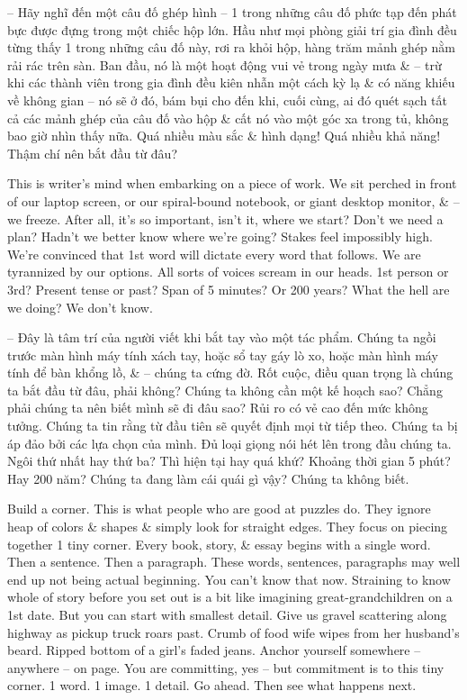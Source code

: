 \documentclass{article}
\begin{document}
\begin{itemize}
	-- Hãy nghĩ đến một câu đố ghép hình -- 1 trong những câu đố phức tạp đến phát bực được đựng trong một chiếc hộp lớn. Hầu như mọi phòng giải trí gia đình đều từng thấy 1 trong những câu đố này, rơi ra khỏi hộp, hàng trăm mảnh ghép nằm rải rác trên sàn. Ban đầu, nó là một hoạt động vui vẻ trong ngày mưa \& -- trừ khi các thành viên trong gia đình đều kiên nhẫn một cách kỳ lạ \& có năng khiếu về không gian -- nó sẽ ở đó, bám bụi cho đến khi, cuối cùng, ai đó quét sạch tất cả các mảnh ghép của câu đố vào hộp \& cất nó vào một góc xa trong tủ, không bao giờ nhìn thấy nữa. Quá nhiều màu sắc \& hình dạng! Quá nhiều khả năng! Thậm chí nên bắt đầu từ đâu?
	
	This is writer's mind when embarking on a piece of work. We sit perched in front of our laptop screen, or our spiral-bound notebook, or giant desktop monitor, \& -- we freeze. After all, it's so important, isn't it, where we start? Don't we need a plan? Hadn't we better know where we're going? Stakes feel impossibly high. We're convinced that 1st word will dictate every word that follows. We are tyrannized by our options. All sorts of voices scream in our heads. 1st person or 3rd? Present tense or past? Span of 5 minutes? Or 200 years? What the hell are we doing? We don't know.
	
	-- Đây là tâm trí của người viết khi bắt tay vào một tác phẩm. Chúng ta ngồi trước màn hình máy tính xách tay, hoặc sổ tay gáy lò xo, hoặc màn hình máy tính để bàn khổng lồ, \& -- chúng ta cứng đờ. Rốt cuộc, điều quan trọng là chúng ta bắt đầu từ đâu, phải không? Chúng ta không cần một kế hoạch sao? Chẳng phải chúng ta nên biết mình sẽ đi đâu sao? Rủi ro có vẻ cao đến mức không tưởng. Chúng ta tin rằng từ đầu tiên sẽ quyết định mọi từ tiếp theo. Chúng ta bị áp đảo bởi các lựa chọn của mình. Đủ loại giọng nói hét lên trong đầu chúng ta. Ngôi thứ nhất hay thứ ba? Thì hiện tại hay quá khứ? Khoảng thời gian 5 phút? Hay 200 năm? Chúng ta đang làm cái quái gì vậy? Chúng ta không biết.
	
	Build a corner. This is what people who are good at puzzles do. They ignore heap of colors \& shapes \& simply look for straight edges. They focus on piecing together 1 tiny corner. Every book, story, \& essay begins with a single word. Then a sentence. Then a paragraph. These words, sentences, paragraphs may well end up not being actual beginning. You can't know that now. Straining to know whole of story before you set out is a bit like imagining great-grandchildren on a 1st date. But you can start with smallest detail. Give us gravel scattering along highway as pickup truck roars past. Crumb of food wife wipes from her husband's beard. Ripped bottom of a girl's faded jeans. Anchor yourself somewhere -- anywhere -- on page. You are committing, yes -- but commitment is to this tiny corner. 1 word. 1 image. 1 detail. Go ahead. Then see what happens next.
	

\end{itemize}
\end{document}
